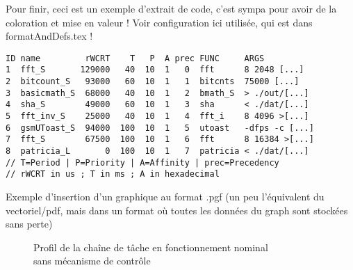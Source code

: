 \documentclass[french, a4paper, 11pt, twoside, pdftex]{StyleThese}
\begin{document}
	Pour finir, ceci est un exemple d'extrait de code, c'est sympa pour avoir de la coloration et mise en valeur !
	Voir configuration ici utilisée, qui est dans formatAndDefs.tex !
	\begin{lstlisting}[caption={Fichier d'entrée pour une chaine de tâche}, label={code:task.in}]
ID name         rWCRT    T   P  A prec FUNC     ARGS
1  fft_S       129000   40  10  1   0  fft      8 2048 [...]
2  bitcount_S   93000   60  10  1   1  bitcnts  75000 [...]
3  basicmath_S  68000   40  10  1   2  bmath_S  > ./out/[...]
4  sha_S        49000   60  10  1   3  sha      < ./dat/[...]
5  fft_inv_S    25000   40  10  1   4  fft_i    8 4096 >[...]
6  gsmUToast_S  94000  100  10  1   5  utoast   -dfps -c [...]
7  fft_S        67500  100  10  1   6  fft      8 16384 >[...]
8  patricia_L       0  100  10  1   7  patricia < ./dat/[...]
// T=Period | P=Priority | A=Affinity | prec=Precedency
// rWCRT in us ; T in ms ; A in hexadecimal
\end{lstlisting} %


	Exemple d'insertion d'un graphique au format .pgf (un peu l'équivalent du vectoriel/pdf, mais dans un format où toutes les données du graph sont stockées sans perte)
\begin{figure}[ht]
	\centering
	\scalebox{0.9}{}
	\captionsetup{justification=centering}
	\caption{Profil de la chaîne de tâche en fonctionnement nominal \\ sans mécanisme de contrôle}
	\label{graph:taskchainsansinterference}
\end{figure}


\ifdefined{}
\else


\end{document}
